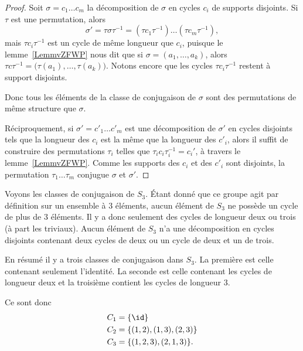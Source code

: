 \begin{proof}
	Soit \( \sigma=c_1\ldots c_m\) la décomposition de \( \sigma\) en cycles \( c_i\) de supports disjoints. Si \( \tau\) est une permutation, alors
	\begin{equation}
		\sigma'=\tau\sigma\tau^{-1}=(\tau c_1\tau^{-1})\ldots (\tau c_m\tau^{-1}),
	\end{equation}
	mais \( \tau c_i\tau^{-1}\) est un cycle de même longueur que \( c_i\), puisque le lemme~\ref{LemmvZFWP} nous dit que si \( \sigma=(a_1,\ldots, a_k)\), alors \( \tau c\tau^{-1}=\big( \tau(a_1),\ldots, \tau(a_k) \big)\). Notons encore que les cycles \( \tau c_i\tau^{-1}\) restent à support disjoints.

	Donc tous les éléments de la classe de conjugaison de \( \sigma\) sont des permutations de même structure que \( \sigma\).

	Réciproquement, si \( \sigma'=c'_1\ldots c'_m\) est une décomposition de \( \sigma'\) en cycles disjoints tels que la longueur des \( c_i\) est la même que la longueur des \( c'_i\), alors il suffit de construire des permutations \( \tau_i\) telles que \( \tau_i c_i\tau_i^{-1}=c_i'\), à travers le lemme~\ref{LemmvZFWP}. Comme les supports des \( c_i\) et des \( c'_i\) sont disjoints, la permutation \( \tau_1\ldots \tau_m\) conjugue \( \sigma\) et \( \sigma'\).
\end{proof}

\begin{example}     \label{EXooQAXRooBsPURs}
	Voyons les classes de conjugaison de \( S_3\). Étant donné que ce groupe agit par définition sur un ensemble à \( 3\) éléments, aucun élément de \( S_3\) ne possède un cycle de plus de \( 3\) éléments. Il y a donc seulement des cycles de longueur deux ou trois (à part les triviaux). Aucun élément de \( S_3\) n'a une décomposition en cycles disjoints contenant deux cycles de deux ou un cycle de deux et un de trois.

	En résumé il y a trois classes de conjugaison dans \( S_3\). La première est celle contenant seulement l'identité. La seconde est celle contenant les cycles de longueur deux et la troisième contient les cycles de longueur \( 3\).

	Ce sont donc
	\begin{subequations}
		\begin{align}
			C_1 & =\{ \id \}               \\
			C_2 & =\{ (1,2),(1,3),(2,3) \} \\
			C_3 & =\{ (1,2,3),(2,1,3) \}.
		\end{align}
	\end{subequations}
\end{example}

